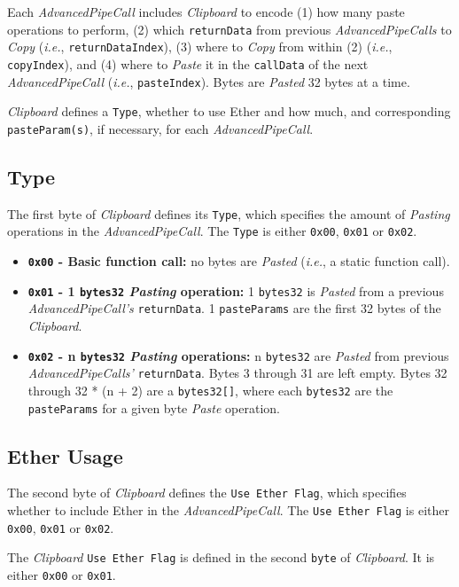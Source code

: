 \documentclass[tikz]{article}
\newcommand{\code}[1]{\texttt{#1}}
\newcommand{\term}[1]{\textsl{#1}}
\begin{document}
Each \term{AdvancedPipeCall} includes \term{Clipboard} to encode (1) how many paste operations to perform, (2) which \code{returnData} from previous \term{AdvancedPipeCalls} to \term{Copy} (\term{i.e.}, \code{returnDataIndex}), (3) where to \term{Copy} from within (2) (\term{i.e.}, \code{copyIndex}), and (4) where to \term{Paste} it in the \code{callData} of the next \term{AdvancedPipeCall} (\term{i.e.}, \code{pasteIndex}). Bytes are \term{Pasted} 32 bytes at a time.

\term{Clipboard} defines a \code{Type}, whether to use Ether and how much, and corresponding \code{pasteParam(s)}, if necessary, for each \term{AdvancedPipeCall}.

\newpage
\subsection{Type}
The first byte of \term{Clipboard} defines its \code{Type}, which specifies the amount of \term{Pasting} operations in the \term{AdvancedPipeCall}. The \code{Type} is either \code{0x00}, \code{0x01} or \code{0x02}.

\begin{itemize}
    \item \textbf{\code{0x00} - Basic function call:} no bytes are \term{Pasted} (\term{i.e.}, a static function call).
    \item \textbf{\code{0x01} - 1 \code{bytes32} \term{Pasting} operation:} 1 \code{bytes32} is \term{Pasted} from a previous \term{AdvancedPipeCall's} \code{returnData}. 1 \code{pasteParams} are the first 32 bytes of the \term{Clipboard}.
    \item \textbf{\code{0x02} - n \code{bytes32} \term{Pasting} operations:} n \code{bytes32} are \term{Pasted} from previous \term{AdvancedPipeCalls'} \code{returnData}. Bytes 3 through 31 are left empty. Bytes 32 through 32 * (n + 2) are a \code{bytes32[]}, where each \code{bytes32} are the \code{pasteParams} for a given byte \term{Paste} operation.
\end{itemize}

\subsection{Ether Usage}
The second byte of \term{Clipboard} defines the \code{Use Ether Flag}, which specifies whether to include Ether in the \term{AdvancedPipeCall}. The \code{Use Ether Flag} is either \code{0x00}, \code{0x01} or \code{0x02}.

The \term{Clipboard} \code{Use Ether Flag} is defined in the second \code{byte} of \term{Clipboard}. It is either \code{0x00} or \code{0x01}. 
\end{document}
